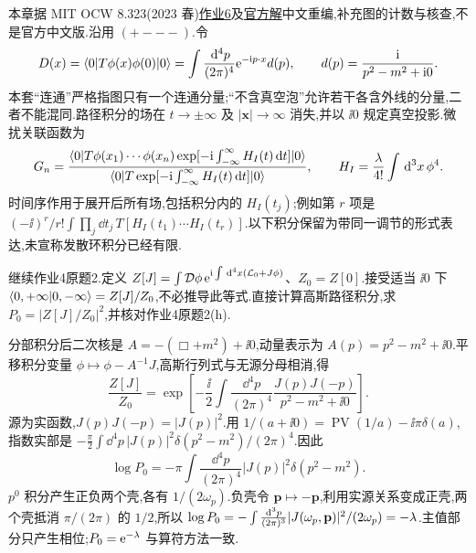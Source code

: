 本章据 MIT OCW 8.323(2023 春)\href{https://ocw.mit.edu/courses/8-323-relativistic-quantum-field-theory-i-spring-2023/mit8_323_s23_pset06.pdf}{作业6}及\href{https://ocw.mit.edu/courses/8-323-relativistic-quantum-field-theory-i-spring-2023/mit8_323_s23_pset_06sol.pdf}{官方解}中文重编,补充图的计数与核查,不是官方中文版.沿用 $(+---)$.令
\[
D(x)=\langle 0\rvert T\phi(x)\phi(0)\lvert 0\rangle=\int\frac{\,\mathrm d^4p}{(2\pi)^4}\mathrm e^{-\mathrm i p\cdot x}d(p),\qquad d(p)=\frac{\mathrm i}{p^2-m^2+\mathrm i0}.
\]
本套“连通”严格指图只有一个连通分量;“不含真空泡”允许若干各含外线的分量,二者不能混同.路径积分的场在 $t\to\pm\infty$ 及 $|\mathbf x|\to\infty$ 消失,并以 $\ii0$ 规定真空投影.微扰关联函数为
\[
G_n=\frac{\langle 0\rvert T\phi(x_1)\cdots\phi(x_n)\exp[-\mathrm i\int_{-\infty}^{\infty}H_I(t)\,\mathrm d t]\lvert 0\rangle}
{\langle 0\rvert T\exp[-\mathrm i\int_{-\infty}^{\infty}H_I(t)\,\mathrm d t]\lvert 0\rangle},\qquad
H_I=\frac{\lambda}{4!}\int\,\mathrm d^3x\,\phi^4.
\]
时间序作用于展开后所有场,包括积分内的 $H_I(t_j)$;例如第 $r$ 项是 $(-\ii)^r/r!\int\prod_j\dd t_j\,T[H_I(t_1)\cdots H_I(t_r)]$.以下积分保留为带同一调节的形式表达,未宣称发散环积分已经有限.

\begin{exercise}
继续作业4原题2.定义 $Z[J]=\int\mathcal D\phi\,\mathrm e^{\mathrm i\int\,\mathrm d^4x(\mathcal L_0+J\phi)}$、$Z_0=Z[0]$.接受适当 $\ii0$ 下 $\langle 0,+\infty\rvert0,-\infty\rangle=Z[J]/Z_0$,不必推导此等式.直接计算高斯路径积分,求 $P_0=|Z[J]/Z_0|^2$,并核对作业4原题2(h).
\end{exercise}
\begin{solution}
分部积分后二次核是 $A=-(\Box+m^2)+\ii0$,动量表示为 $A(p)=p^2-m^2+\ii0$.平移积分变量 $\phi\mapsto\phi-A^{-1}J$,高斯行列式与无源分母相消,得
\[
\frac{Z[J]}{Z_0}=\exp\left[-\frac{\ii}{2}\int\frac{\dd^4p}{(2\pi)^4}\frac{J(p)J(-p)}{p^2-m^2+\ii0}\right].
\]
源为实函数,$J(p)J(-p)=|J(p)|^2$.用 $1/(a+\ii0)=\operatorname{PV}(1/a)-\ii\pi\delta(a)$,指数实部是 $-\tfrac\pi2\int\dd^4p\,|J(p)|^2\delta(p^2-m^2)/(2\pi)^4$.因此
\[
\log P_0=-\pi\int\frac{\dd^4p}{(2\pi)^4}|J(p)|^2\delta(p^2-m^2).
\]
$p^0$ 积分产生正负两个壳,各有 $1/(2\omega_p)$.负壳令 $\mathbf p\mapsto-\mathbf p$,利用实源关系变成正壳,两个壳抵消 $\pi/(2\pi)$ 的 $1/2$,所以 $\log P_0=-\int\frac{\mathrm d^3p}{(2\pi)^3}|J(\omega_p,\mathbf p)|^2/(2\omega_p)=-\lambda$.主值部分只产生相位;$P_0=\mathrm e^{-\lambda}$ 与算符方法一致.
\end{solution}

